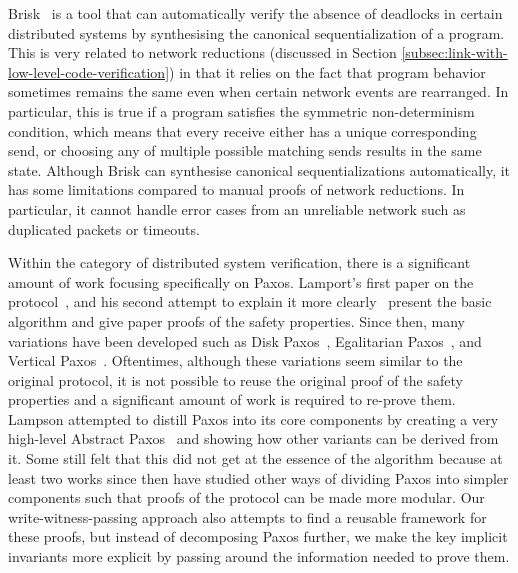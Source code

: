 {Brisk~\cite{canonical} is a tool that can automatically verify the absence of deadlocks in certain distributed systems
by synthesising the canonical sequentialization of a program.
This is very related to network reductions (discussed in Section \ref{subsec:link-with-low-level-code-verification})
in that it relies on the fact that program behavior sometimes remains the same even when certain network events are rearranged.
In particular, this is true if a program satisfies the symmetric non-determinism condition, which means
that every receive either has a unique corresponding send, or choosing any of multiple possible matching sends results in the same state.
Although Brisk can synthesise canonical sequentializations automatically, it has some limitations compared to manual proofs
of network reductions.
In particular, it cannot handle error cases from an unreliable network such as duplicated packets or timeouts.

Within the category of distributed system verification, there is a significant amount of work focusing specifically on Paxos.
Lamport's first paper on the protocol~\cite{paxos}, and his second attempt to explain it more clearly~\cite{paxosmadesimple}
present the basic algorithm and give paper proofs of the safety properties.
Since then, many variations have been developed such as Disk Paxos~\cite{diskpaxos}, Egalitarian Paxos~\cite{epaxos},
and Vertical Paxos~\cite{vertpaxos}.
Oftentimes, although these variations seem similar to the original protocol, it is not possible to reuse the original
proof of the safety properties and a significant amount of work is required to re-prove them.
Lampson attempted to distill Paxos into its core components by creating a very high-level Abstract Paxos~\cite{Lampson2001}
and showing how other variants can be derived from it.
Some still felt that this did not get at the essence of the algorithm because at least two works since then \cite{dpaxos, sdpaxos}
have studied other ways of dividing Paxos into simpler components such that proofs of the protocol can be made more modular.
Our write-witness-passing approach also attempts to find a reusable framework for these proofs,
but instead of decomposing Paxos further, we make the key implicit invariants more explicit by passing around
the information needed to prove them.

} %

